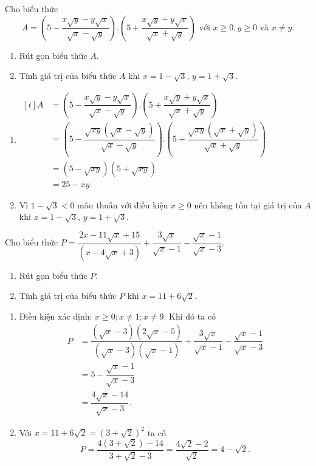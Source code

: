 \begin{vd}
	Cho biểu thức $$A=\left(5-\dfrac{x\sqrt{y}-y\sqrt{x}}{\sqrt{x}-\sqrt{y}}\right).\left(5+\dfrac{x\sqrt{y}+y\sqrt{x}}{\sqrt{x}+\sqrt{y}}\right) \text{ với } x\ge0,y\ge0 \text{ và } x\ne y.$$
	\begin{enumerate}
		\item Rút gọn biểu thức $A$.
		\item Tính giá trị của biểu thức $A$ khi $x=1-\sqrt{3}$, $y=1+\sqrt{3}$.
	\end{enumerate}
	\loigiai
	{
		\begin{enumerate}
			\item 
				$\begin{aligned}[t]
				A&=\left(5-\dfrac{x\sqrt{y}-y\sqrt{x}}{\sqrt{x}-\sqrt{y}}\right).\left(5+\dfrac{x\sqrt{y}+y\sqrt{x}}{\sqrt{x}+\sqrt{y}}\right)\\
				&=\left(5-\dfrac{\sqrt{xy}(\sqrt{x}-\sqrt{y})}{\sqrt{x}-\sqrt{y}}\right).\left(5+\dfrac{\sqrt{xy}(\sqrt{x}+\sqrt{y})}{\sqrt{x}+\sqrt{y}}\right)\\
				&=(5-\sqrt{xy})(5+\sqrt{xy})\\
				&=25-xy.
			\end{aligned}$
			\item Vì $1-\sqrt{3}<0$ mâu thuẫn với điều kiện $x\ge 0$ nên không tồn tại giá trị của $A$ khi $x=1-\sqrt{3}$, $y=1+\sqrt{3}$.
	\end{enumerate}}
\end{vd}

\begin{vd}
	Cho biểu thức $P=\dfrac{2x-11\sqrt{x}+15}{(x-4\sqrt{x}+3)}+\dfrac{3\sqrt{x}}{\sqrt{x}-1}-\dfrac{\sqrt{x}-1}{\sqrt{x}-3}$.
	\begin{enumerate}    
		\item Rút gọn biểu thức $P$.
		\item Tính giá trị của biểu thức  $P$ khi $x=11+6\sqrt{2}$.
	\end{enumerate}
	
	\loigiai
	{
		\begin{enumerate}
			\item Điều kiện xác định: $x \geq 0; x\ne 1; x\ne 9$. Khi đó ta có \\
			\begin{align*}
			P&=\dfrac{\left(\sqrt{x}-3\right)\left(2\sqrt{x}-5\right)}{\left(\sqrt{x}-3\right)\left(\sqrt{x}-1\right)}+\dfrac{3\sqrt{x}}{\sqrt{x}-1}-\dfrac{\sqrt{x}-1}{\sqrt{x}-3}\\
			&=5-\dfrac{\sqrt{x}-1}{\sqrt{x}-3}\\
			&=\dfrac{4\sqrt{x}-14}{\sqrt{x}-3}.
			\end{align*}
			\item Với $x=11+6\sqrt{2}=(3+\sqrt{2})^2$ ta có
			$$P=\dfrac{4(3+\sqrt{2})-14}{3+\sqrt{2}-3}=\dfrac{4\sqrt{2}-2}{\sqrt{2}}=4-\sqrt{2}.$$
		\end{enumerate}
	}
\end{vd}


